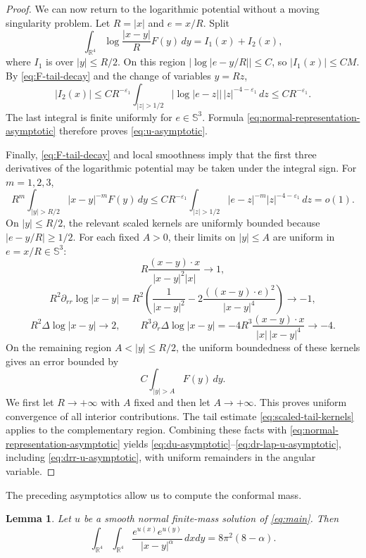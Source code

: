 \documentclass[11pt]{article}
\newtheorem{lemma}[theorem]{Lemma}
\numberwithin{equation}{section}
\begin{document}
\begin{proof}
We can now return to the logarithmic potential without a moving singularity problem. Let \(R=|x|\) and \(e=x/R\). Split
\[
\int_{\mathbb R^{4}}\log\frac{|x-y|}{R}F(y)\,dy
=I_{1}(x)+I_{2}(x),
\]
where \(I_1\) is over \(|y|\leq R/2\). On this region
\(|\log|e-y/R||\leq C\), so \(|I_1(x)|\leq CM\). By \eqref{eq:F-tail-decay} and the change of variables \(y=Rz\),
\[
|I_2(x)|
\leq C R^{-\varepsilon_{1}}
\int_{|z|>1/2}|\log|e-z||\,|z|^{-4-\varepsilon_{1}}\,dz
\leq C R^{-\varepsilon_{1}}.
\]
The last integral is finite uniformly for \(e\in\mathbb S^{3}\). Formula
\eqref{eq:normal-representation-asymptotic} therefore proves
\eqref{eq:u-asymptotic}.

Finally, \eqref{eq:F-tail-decay} and local smoothness imply that the first three derivatives of the logarithmic potential may be taken under the integral sign. For \(m=1,2,3\),
\begin{equation}\label{eq:scaled-tail-kernels}
R^{m}\int_{|y|>R/2}|x-y|^{-m}F(y)\,dy
\leq C R^{-\varepsilon_{1}}
\int_{|z|>1/2}|e-z|^{-m}|z|^{-4-\varepsilon_{1}}\,dz
=o(1).
\end{equation}
On \(|y|\leq R/2\), the relevant scaled kernels are uniformly bounded because
\(|e-y/R|\geq1/2\). For each fixed \(A>0\), their limits on \(|y|\leq A\)
are uniform in \(e=x/R\in\mathbb S^{3}\):
\[
R\frac{(x-y)\cdot x}{|x-y|^{2}|x|}\longrightarrow1,
\]
\[
R^{2}\partial_{rr}\log|x-y|
=R^{2}\left(
\frac{1}{|x-y|^{2}}
-2\frac{((x-y)\cdot e)^{2}}{|x-y|^{4}}
\right)\longrightarrow-1,
\]
\[
R^{2}\Delta\log|x-y|\longrightarrow2,
\qquad
R^{3}\partial_{r}\Delta\log|x-y|
=-4R^{3}\frac{(x-y)\cdot x}{|x|\,|x-y|^{4}}
\longrightarrow-4.
\]
On the remaining region \(A<|y|\leq R/2\), the uniform boundedness of these
kernels gives an error bounded by
\[
C\int_{|y|>A}F(y)\,dy.
\]
We first let \(R\to+\infty\) with \(A\) fixed and then let \(A\to+\infty\).
This proves uniform convergence of all interior contributions. The tail
estimate \eqref{eq:scaled-tail-kernels} applies to the complementary region.
Combining these facts with \eqref{eq:normal-representation-asymptotic} yields
\eqref{eq:du-asymptotic}--\eqref{eq:dr-lap-u-asymptotic}, including
\eqref{eq:drr-u-asymptotic}, with uniform remainders in the angular variable.
\end{proof}

The preceding asymptotics allow us to compute the conformal mass.

\begin{lemma}\label{lem:pohozaev}
Let \(u\) be a smooth normal finite-mass solution of \eqref{eq:main}. Then
\begin{equation}\label{eq:pohozaev}
\int_{\mathbb R^{4}}\int_{\mathbb R^{4}}
\frac{e^{u(x)}e^{u(y)}}{|x-y|^{\alpha}}\,dxdy
=
8\pi^{2}(8-\alpha).
\end{equation}
\end{lemma}
\end{document}
